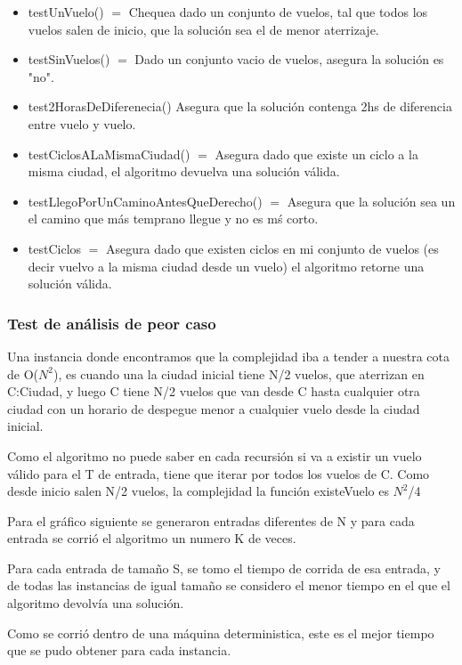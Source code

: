 \begin{itemize}
  \item testUnVuelo() $=$ Chequea dado un conjunto de vuelos, tal que todos los vuelos salen de inicio, que la soluci\'on sea el de menor aterrizaje.
  \item 	testSinVuelos() $=$ Dado un conjunto vacio de vuelos, asegura la soluci\'on es "no".
  \item test2HorasDeDiferenecia() Asegura que la soluci\'on contenga 2hs de diferencia entre vuelo y vuelo.
  \item testCiclosALaMismaCiudad() $=$ Asegura dado que existe un ciclo a la misma ciudad, el algoritmo devuelva una soluci\'on v\'alida.
  \item testLlegoPorUnCaminoAntesQueDerecho() $=$ Asegura que la soluci\'on sea un el camino que m\'as temprano llegue y no es m\'s corto.
  \item testCiclos $=$ Asegura dado que existen ciclos en mi conjunto de vuelos (es decir vuelvo a la misma ciudad desde un vuelo) el algoritmo retorne una soluci\'on v\'alida.
\end{itemize}

\newpage
\subsubsection{Test de an\'alisis de peor caso}

Una instancia donde encontramos que la complejidad iba a tender a nuestra cota de O($N^{2}$), es cuando una la ciudad inicial tiene N/2 vuelos, que aterrizan en C:Ciudad, y luego C tiene N/2 vuelos que van desde C hasta cualquier otra ciudad con un horario de despegue menor a cualquier vuelo desde la ciudad inicial.

Como el algoritmo no puede saber en cada recursi\'on si va a existir un vuelo v\'alido para el T de entrada, tiene que iterar por todos los vuelos de C. Como desde inicio salen N/2 vuelos, la complejidad la funci\'on existeVuelo es $N^{2}$/4

Para el gr\'afico siguiente se generaron entradas diferentes de N y para cada entrada se corri\'o el algoritmo un numero K de veces.

Para cada entrada de tamaño S, se tomo el tiempo de corrida de esa entrada, y de todas las instancias de igual tamaño se considero el menor tiempo en el que el algoritmo devolv\'ia una soluci\'on.

Como se corri\'o dentro de una m\'aquina deterministica, este es el mejor tiempo que se pudo obtener para cada instancia. 

